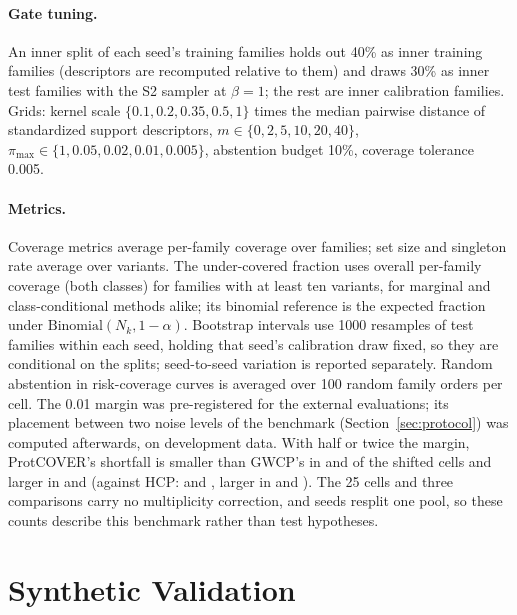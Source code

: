 \paragraph{Gate tuning.} An inner split of each seed's training families holds out 40\% as inner training families (descriptors are recomputed relative to them) and draws 30\% as inner test families with the S2 sampler at $\beta=1$; the rest are inner calibration families. Grids: kernel scale $\{0.1,0.2,0.35,0.5,1\}$ times the median pairwise distance of standardized support descriptors, $m\in\{0,2,5,10,20,40\}$, $\pi_{\max}\in\{1,0.05,0.02,0.01,0.005\}$, abstention budget 10\%, coverage tolerance 0.005.

\paragraph{Metrics.} Coverage metrics average per-family coverage over families; set size and singleton rate average over variants. The under-covered fraction uses overall per-family coverage (both classes) for families with at least ten variants, for marginal and class-conditional methods alike; its binomial reference is the expected fraction under $\mathrm{Binomial}(N_k,1-\alpha)$. Bootstrap intervals use 1000 resamples of test families within each seed, holding that seed's calibration draw fixed, so they are conditional on the splits; seed-to-seed variation is reported separately. Random abstention in risk-coverage curves is averaged over 100 random family orders per cell. The 0.01 margin was pre-registered for the external evaluations; its placement between two noise levels of the benchmark (Section~\ref{sec:protocol}) was computed afterwards, on development data. With half or twice the margin, ProtCOVER's shortfall is smaller than GWCP's in \marginCrGwcpBetterHalf{} and \marginCrGwcpBetterDouble{} of the \nShiftCells{} shifted cells and larger in \marginCrGwcpWorseHalf{} and \marginCrGwcpWorseDouble{} (against HCP: \marginCrHcpBetterHalf{} and \marginCrHcpBetterDouble{}, larger in \marginCrHcpWorseHalf{} and \marginCrHcpWorseDouble{}). The 25 cells and three comparisons carry no multiplicity correction, and seeds resplit one pool, so these counts describe this benchmark rather than test hypotheses.

\section{Synthetic Validation}\label{app:synthetic}

